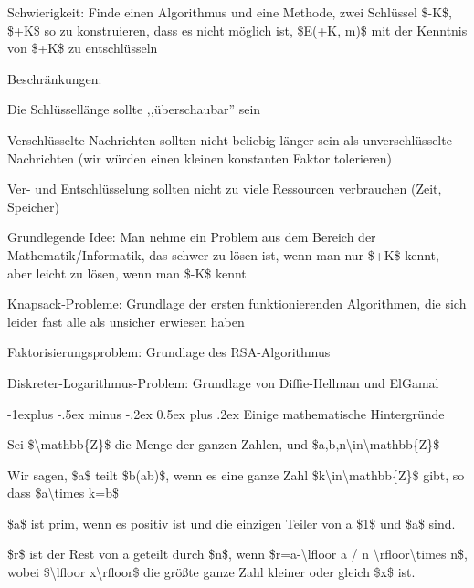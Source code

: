 \documentclass[a4paper]{article}
\makeatletter
\renewcommand{\subsection}{\@startsection{subsection}{2}{0mm}%
 {-1explus -.5ex minus -.2ex}%
 {0.5ex plus .2ex}%
 {\normalfont\normalsize\bfseries}}
\makeatother
\begin{document}
\begin{multicols}{3}
\begin{itemize*}
            \begin{itemize*}
                  \item Schwierigkeit: Finde einen Algorithmus und eine Methode, zwei Schlüssel \$-K\$, \$+K\$ so zu konstruieren, dass es nicht möglich ist, \$E(+K, m)\$ mit der Kenntnis von \$+K\$ zu entschlüsseln
                  \item Beschränkungen:
                  \begin{itemize*} \item Die Schlüssellänge sollte ,,überschaubar'' sein \item Verschlüsselte Nachrichten sollten nicht beliebig länger sein als unverschlüsselte Nachrichten (wir würden einen kleinen konstanten Faktor tolerieren) \item Ver- und Entschlüsselung sollten nicht zu viele Ressourcen verbrauchen (Zeit, Speicher) \end{itemize*}
                  \item Grundlegende Idee: Man nehme ein Problem aus dem Bereich der Mathematik/Informatik, das schwer zu lösen ist, wenn man nur \$+K\$ kennt, aber leicht zu lösen, wenn man \$-K\$ kennt
                  \begin{itemize*} \item Knapsack-Probleme: Grundlage der ersten funktionierenden Algorithmen, die sich leider fast alle als unsicher erwiesen haben \item Faktorisierungsproblem: Grundlage des RSA-Algorithmus \item Diskreter-Logarithmus-Problem: Grundlage von Diffie-Hellman und ElGamal \end{itemize*}
            \end{itemize*}
      \end{itemize*}


      \subsection{Einige mathematische
            Hintergründe}

      \begin{itemize*}
            \item
            Sei \$\textbackslash mathbb\{Z\}\$ die Menge der ganzen Zahlen, und
            \$a,b,n\textbackslash in\textbackslash mathbb\{Z\}\$
            \item
            Wir sagen, \$a\$ teilt \$b(a\textbar b)\$, wenn es eine ganze Zahl
            \$k\textbackslash in\textbackslash mathbb\{Z\}\$ gibt, so dass
            \$a\textbackslash times k=b\$
            \item
            \$a\$ ist prim, wenn es positiv ist und die einzigen Teiler von a
            \$1\$ und \$a\$ sind.
            \item
            \$r\$ ist der Rest von a geteilt durch \$n\$, wenn
            \$r=a-\textbackslash lfloor a / n
            \textbackslash rfloor\textbackslash times n\$, wobei
            \$\textbackslash lfloor x\textbackslash rfloor\$ die größte ganze Zahl
            kleiner oder gleich \$x\$ ist.


\end{itemize*}
\end{multicols}
\end{document}

